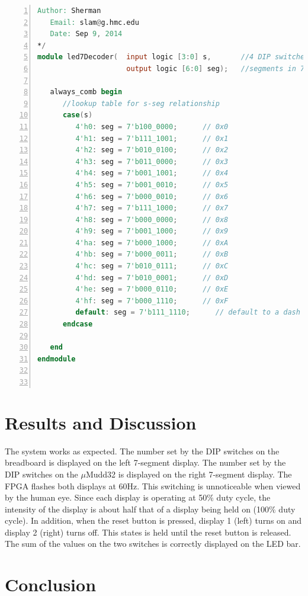 \documentclass[11pt]{article}
\begin{document}
\begin{lstlisting}[language=Verilog,numbers=left,basicstyle=\footnotesize]
   Author: Sherman
   Email: slam@g.hmc.edu
   Date: Sep 9, 2014
*/
module led7Decoder(  input logic [3:0] s,       //4 DIP switches
                     output logic [6:0] seg);   //segments in 7-seg display
                     
   always_comb begin
      //lookup table for s-seg relationship
      case(s)
         4'h0: seg = 7'b100_0000;      // 0x0
         4'h1: seg = 7'b111_1001;      // 0x1
         4'h2: seg = 7'b010_0100;      // 0x2
         4'h3: seg = 7'b011_0000;      // 0x3
         4'h4: seg = 7'b001_1001;      // 0x4
         4'h5: seg = 7'b001_0010;      // 0x5
         4'h6: seg = 7'b000_0010;      // 0x6
         4'h7: seg = 7'b111_1000;      // 0x7
         4'h8: seg = 7'b000_0000;      // 0x8
         4'h9: seg = 7'b001_1000;      // 0x9
         4'ha: seg = 7'b000_1000;      // 0xA
         4'hb: seg = 7'b000_0011;      // 0xB
         4'hc: seg = 7'b010_0111;      // 0xC
         4'hd: seg = 7'b010_0001;      // 0xD
         4'he: seg = 7'b000_0110;      // 0xE
         4'hf: seg = 7'b000_1110;      // 0xF
         default: seg = 7'b111_1110;      // default to a dash
      endcase
      
   end
endmodule



\end{lstlisting}


\clearpage

\section{Results and Discussion}

The system works as expected. The number set by the DIP switches on the breadboard is displayed on the left 7-segment display. The number set by the DIP switches on the $\mu$Mudd32 is displayed on the right 7-segment display. The FPGA flashes both displays at 60Hz. This switching is unnoticeable when viewed by the human eye. Since each display is operating at 50$\%$ duty cycle, the intensity of the display is about half that of a display being held on (100$\%$ duty cycle). In addition, when the reset button is pressed, display 1 (left) turns on and display 2 (right) turns off. This states is held until the reset button is released. The sum of the values on the two switches is correctly displayed on the LED bar. \\


\section{Conclusion}
\end{document}
